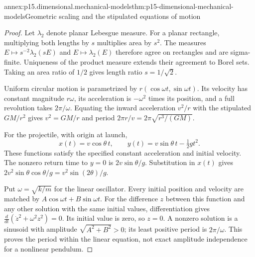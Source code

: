 \begin{annexitem}{annex:p15.dimensional.mechanical-models}{thm:p15-dimensional-mechanical-models}{Geometric scaling and the stipulated equations of motion}
\begin{proof}
Let \(\lambda_2\) denote planar Lebesgue measure.
For a planar rectangle, multiplying both lengths by \(s\) multiplies
area by \(s^2\). The measures \(E\mapsto s^{-2}\lambda_2(sE)\) and
\(E\mapsto\lambda_2(E)\) therefore agree on rectangles and are
sigma-finite. Uniqueness of the product measure extends their agreement
to Borel sets. Taking an area ratio of \(1/2\) gives length ratio
\(s=1/\sqrt2\).

Uniform circular motion is parametrized by
\(r(\cos\omega t,\sin\omega t)\). Its velocity has constant magnitude
\(r\omega\), its acceleration is \(-\omega^2\) times its position,
and a full revolution takes \(2\pi/\omega\).
Equating the inward acceleration \(v^2/r\) with the stipulated
\(GM/r^2\) gives \(v^2=GM/r\) and period
\(2\pi r/v=2\pi\sqrt{r^3/(GM)}\).

For the projectile, with origin at launch,
\[
 x(t)=v\cos\theta\,t,\qquad
 y(t)=v\sin\theta\,t-\tfrac12gt^2.
\]
These functions satisfy the specified constant acceleration and initial
velocity. The nonzero return time to \(y=0\) is \(2v\sin\theta/g\).
Substitution in \(x(t)\) gives
\(2v^2\sin\theta\cos\theta/g=v^2\sin(2\theta)/g\).

Put \(\omega=\sqrt{k/m}\) for the linear oscillator.
Every initial position and velocity are matched by
\(A\cos\omega t+B\sin\omega t\).
For the difference \(z\) between this function and any other solution
with the same initial values, differentiation gives
\(\frac{d}{dt}(\dot z^2+\omega^2z^2)=0\).
Its initial value is zero, so \(z=0\). A nonzero solution is a sinusoid
with amplitude \(\sqrt{A^2+B^2}>0\); its least positive period is
\(2\pi/\omega\). This proves the period within the linear equation,
not exact amplitude independence for a nonlinear pendulum.
\end{proof}
\end{annexitem}

